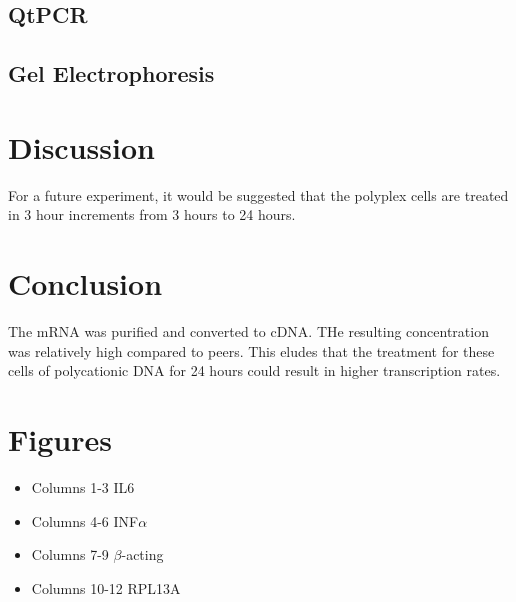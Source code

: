 \documentclass[journal, a4paper]{IEEEtran}
\begin{document}
  \subsection{QtPCR}

  \subsection{Gel Electrophoresis}

\section{Discussion}

For a future experiment, it would be suggested that the polyplex cells are treated in 3 hour increments from 3 hours to 24 hours.

\section{Conclusion}
The mRNA was purified and converted to cDNA. THe resulting concentration was relatively high compared to peers. This eludes that the
treatment for these cells of polycationic DNA for 24 hours could result in higher transcription rates.

\section{Figures}

  \begin{itemize}
    \item Columns 1-3 IL6
    \item Columns 4-6 INF$\alpha$
    \item Columns 7-9 $\beta$-acting
    \item Columns 10-12 RPL13A
  \end{itemize}
\end{document}
